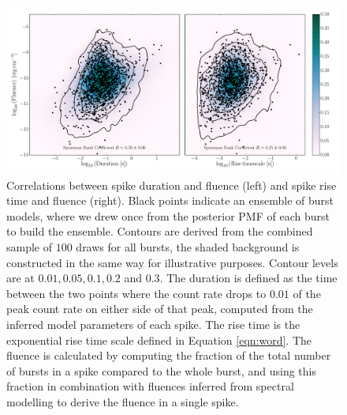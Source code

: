 \documentclass[12pt]{emulateapj}
\begin{document}
 \begin{figure}[htbp]
\begin{center}
\includegraphics[width=\textwidth]{sgr1550_correlations.pdf}
\caption{Correlations between spike duration and fluence (left) and spike rise time and fluence (right). Black points indicate an ensemble of burst models, where we drew once
from the posterior PMF of each burst to build the ensemble. Contours are derived from the combined sample of $100$ draws for all bursts, the shaded background is constructed in
the same way for illustrative purposes. Contour levels are at $0.01, 0.05, 0.1, 0.2$ and $0.3$.
The duration is defined as the time between the two points where
the count rate drops to $0.01$ of the peak count rate on either side of that peak, computed from the inferred model parameters of each spike. The rise time is the exponential
rise time scale defined in Equation \ref{eqn:word}. The fluence is calculated by computing the fraction of the total number of bursts in a spike compared to the whole burst, and using
this fraction in combination with fluences inferred from spectral modelling\citep{vanderhorst2012,vonkienlin2012} to derive the fluence in a single spike.}
\label{fig:correlations}
\end{center}
\end{figure}
\end{document}
